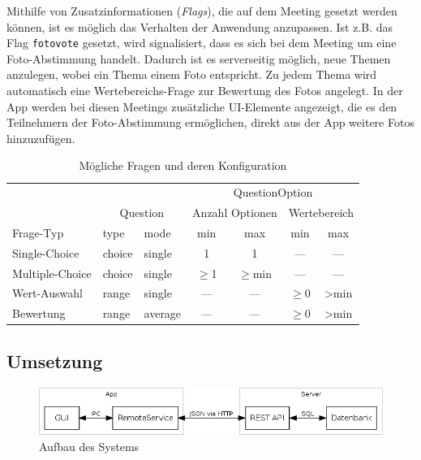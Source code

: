 Mithilfe von Zusatzinformationen (\emph{Flags}), die auf dem Meeting gesetzt werden können, ist es möglich das Verhalten der Anwendung anzupassen. Ist z.B. das Flag \texttt{fotovote} gesetzt, wird signalisiert, dass es sich bei dem Meeting um eine Foto-Abstimmung handelt. Dadurch ist es serverseitig möglich, neue Themen anzulegen, wobei ein Thema einem Foto entspricht. Zu jedem Thema wird automatisch eine Wertebereichs-Frage zur Bewertung des Fotos angelegt. In der App werden bei diesen Meetings zusätzliche UI-Elemente angezeigt, die es den Teilnehmern der Foto-Abstimmung ermöglichen, direkt aus der App weitere Fotos hinzuzufügen.

\begin{table}
\begin{center}
\begin{tabular}{l l l c c c c}
& & & \multicolumn{4}{c}{QuestionOption} \\
& \multicolumn{2}{c}{Question} & \multicolumn{2}{c}{Anzahl Optionen} & \multicolumn{2}{c}{Wertebereich} \\
Frage-Typ & type & mode & min & max & min & max \\
\hline
Single-Choice & choice & single & 1 & 1 & --- & --- \\
Multiple-Choice & choice & single & $\geq$1 & $\geq$min & --- & --- \\
Wert-Auswahl & range & single & --- & --- & $\geq$0 & >min \\
Bewertung & range & average & --- & --- & $\geq$0 & >min \\
\end{tabular}
\caption{Mögliche Fragen und deren Konfiguration}
\label{table:questiontypes}
\end{center}
\end{table}

\subsection{Umsetzung}

\begin{figure}[htb]
\begin{center}
\includegraphics[width=\textwidth]{media/system.png}
\end{center}
\caption{Aufbau des Systems}
\label{f:system}
\end{figure}

